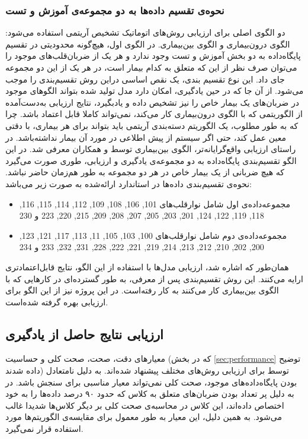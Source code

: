 		\subsubsection{نحوه‌ی تقسیم داده‌ها به دو مجموعه‌ی آموزش و تست}
		دو الگوی اصلی برای ارزیابی روش‌های اتوماتیک تشخیص آریتمی استفاده می‌شود: الگوی درون‌بیماری و الگوی بین‌بیماری. در الگوی اول، هیچ‌گونه محدودیتی در تقسیم پایگاه‌داده به دو بخش آموزش و تست وجود ندارد و هر یک از ضربان‌قلب‌های موجود را می‌توان صرف نظر از این که متعلق به کدام بیمار است، در هر یک از این دو مجموعه جای داد. این نوع تقسیم بندی، یک نقص اساسی دراین روش تقسیم‌بندی را موجب می‌شود. از آن جا که در حین یادگیری، امکان دارد مدل تولید شده بتواند الگوهای موجود در ضربان‌های یک بیمار خاص را نیز تشخیص داده و یادبگیرد، نتایج ارزیابی به‌دست‌آمده از الگوریتمی که با الگوی درون‌بیماری کار می‌کند، نمی‌تواند کاملا قابل اعتماد باشد. چرا که به طور مطلوب، یک الگوریتم دسته‌بندی آریتمی باید بتواند برای هر بیماری، با دقتی معین عمل کند، حتی اگر سیستم از پیش اطلاعی در مورد آن بیمار نداشته‌باشد. 
در راستای ارزیابی واقع‌گرایانه‌تر، الگوی بین‌بیماری توسط  و همکاران معرفی شد.\cite{deChazal2004} در این الگو تقسیم‌بندی پایگاه‌داده به دو مجموعه‌ی یادگیری و ارزیابی، طوری صورت می‌گیرد که هیچ ضربانی از یک بیمار خاص در هر دو مجموعه به طور هم‌زمان حاضر نباشد. نحوه‌ی تقسیم‌بندی داده‌ها در استاندارد ارائه‌شده به صورت زیر می‌باشد:
\begin{itemize}
	\item مجموعه‌داده‌ی اول  شامل نوارقلب‌های 101, 106, 108, 109, 112, 114, 115, 116, 118,
119, 122, 124, 201, 203, 205, 207, 208, 209, 215, 220, 223 و
230
	\item مجموعه‌داده‌ی دوم  شامل نوارقلب‌های 100, 103, 105, 11, 113, 117, 121, 123,
200, 202, 210, 212, 213, 214, 219, 221, 222, 228, 231, 232, 233
و 234
\end{itemize}
 همان‌طور که اشاره شد، ارزیابی مدل‌ها با استفاده از این الگو، نتایج قابل‌اعتمادتری ارایه می‌کنند. این روش تقسیم‌بندی پس از معرفی، به طور گسترده‌ای در کارهایی که با الگوی بین‌بیماری کار می‌کنند به کار رفته‌است. در این پروژه نیز از این الگو برای ارزیابی بهره گرفته شده‌است. 



	\subsection{ارزیابی نتایج حاصل از یادگیری}
	معیارهای دقت، صحت، صحت کلی و حساسیت (که در بخش \ref{sec:performance} توضیح داده شدند) توسط  برای ارزیابی روش‌های مختلف پیشنهاد شده‌اند. 
به دلیل نامتعادل بودن پایگاه‌داده‌های موجود، صحت کلی نمی‌تواند معیار مناسبی برای سنجش باشد. در به دلیل پر تعداد بودن ضربان‌های متعلق به کلاس  که حدود ۹۰ درصد داده‌ها را به خود اختصاص داده‌اند،‌ این کلاس در محاسبه‌ی صحت کلی بر دیگر کلاس‌ها شدیدا غالب می‌شود. به همین دلیل، این معیار به طور معمول برای مقایسه‌ی الگوریتم‌ها مورد استفاده قرار نمی‌گیرد.

